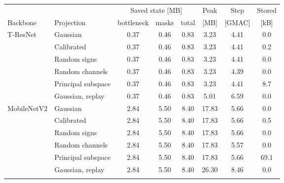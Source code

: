 \begin{tabular}{@{}ll ccc c c c@{}}
\toprule
 & & \multicolumn{3}{c}{Saved state [MB]} & Peak & Step & Stored \\
\cmidrule(lr){3-5}
Backbone & Projection & bottleneck & masks & total & [MB] & [GMAC] & [kB] \\
\midrule
T-ResNet & Gaussian & 0.37 & 0.46 & 0.83 & 3.23 & 4.41 & 0.0 \\
 & Calibrated & 0.37 & 0.46 & 0.83 & 3.23 & 4.41 & 0.2 \\
 & Random signs & 0.37 & 0.46 & 0.83 & 3.23 & 4.41 & 0.0 \\
 & Random channels & 0.37 & 0.46 & 0.83 & 3.23 & 4.39 & 0.0 \\
 & Principal subspace & 0.37 & 0.46 & 0.83 & 3.23 & 4.41 & 8.7 \\
 & Gaussian, replay & 0.37 & 0.46 & 0.83 & 5.01 & 6.59 & 0.0 \\
\midrule
MobileNetV2 & Gaussian & 2.84 & 5.50 & 8.40 & 17.83 & 5.66 & 0.0 \\
 & Calibrated & 2.84 & 5.50 & 8.40 & 17.83 & 5.66 & 0.5 \\
 & Random signs & 2.84 & 5.50 & 8.40 & 17.83 & 5.66 & 0.0 \\
 & Random channels & 2.84 & 5.50 & 8.40 & 17.83 & 5.57 & 0.0 \\
 & Principal subspace & 2.84 & 5.50 & 8.40 & 17.83 & 5.66 & 69.1 \\
 & Gaussian, replay & 2.84 & 5.50 & 8.40 & 26.30 & 8.46 & 0.0 \\
\botrule
\end{tabular}
